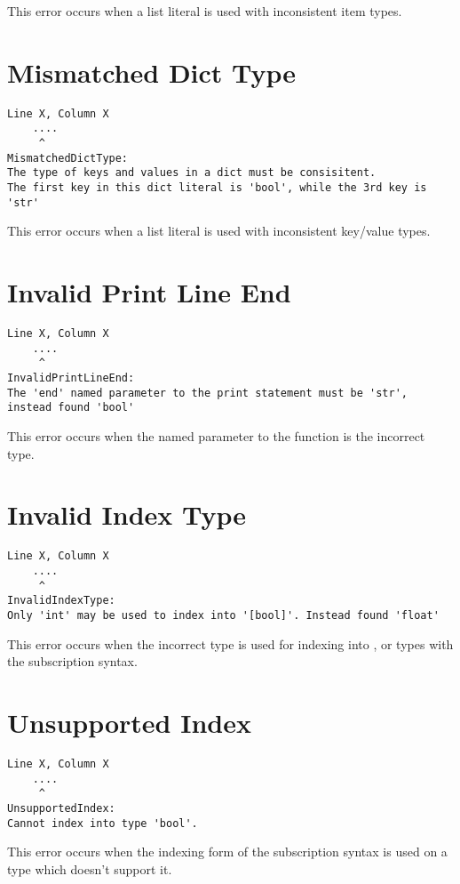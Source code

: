 This error occurs when a list literal is used with inconsistent item types.

\section{Mismatched Dict Type}
\begin{lstlisting}[breaklines]
Line X, Column X
    ....
     ^
MismatchedDictType:
The type of keys and values in a dict must be consisitent.
The first key in this dict literal is 'bool', while the 3rd key is 'str'
\end{lstlisting}

This error occurs when a list literal is used with inconsistent key/value types.

\section{Invalid Print Line End}
\begin{lstlisting}[breaklines]
Line X, Column X
    ....
     ^
InvalidPrintLineEnd:
The 'end' named parameter to the print statement must be 'str', instead found 'bool'
\end{lstlisting}

This error occurs when the  named parameter to the  function is
the incorrect type.

\section{Invalid Index Type}
\begin{lstlisting}[breaklines]
Line X, Column X
    ....
     ^
InvalidIndexType:
Only 'int' may be used to index into '[bool]'. Instead found 'float'
\end{lstlisting}

This error occurs when the incorrect type is used for indexing into ,
 or  types with the subscription syntax.

\section{Unsupported Index}
\begin{lstlisting}[breaklines]
Line X, Column X
    ....
     ^
UnsupportedIndex:
Cannot index into type 'bool'.
\end{lstlisting}

This error occurs when the indexing form of the subscription syntax is used on a
type which doesn't support it.

